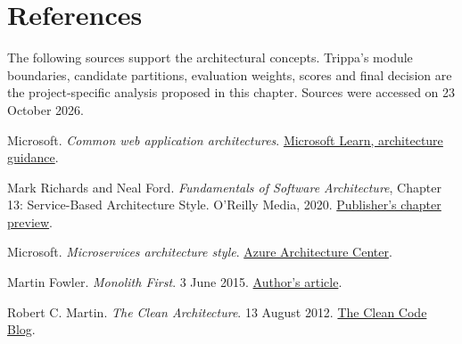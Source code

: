 \section{References}
The following sources support the architectural concepts. Trippa's module boundaries, candidate partitions, evaluation weights, scores and final decision are the project-specific analysis proposed in this chapter. Sources were accessed on 23 October 2026.
\begin{enumerate}[label={[\arabic*]},leftmargin=*,itemsep=8pt]
\item\label{ref:common} Microsoft. \emph{Common web application architectures}. \href{https://learn.microsoft.com/en-us/dotnet/architecture/modern-web-apps-azure/common-web-application-architectures}{Microsoft Learn, architecture guidance}.
\item\label{ref:servicebased} Mark Richards and Neal Ford. \emph{Fundamentals of Software Architecture}, Chapter 13: Service-Based Architecture Style. O'Reilly Media, 2020. \href{https://www.oreilly.com/library/view/fundamentals-of-software/9781492043447/ch13.html}{Publisher's chapter preview}.
\item\label{ref:microservices} Microsoft. \emph{Microservices architecture style}. \href{https://learn.microsoft.com/en-us/azure/architecture/guide/architecture-styles/microservices}{Azure Architecture Center}.
\item\label{ref:monolithfirst} Martin Fowler. \emph{Monolith First}. 3 June 2015. \href{https://martinfowler.com/bliki/MonolithFirst.html}{Author's article}.
\item\label{ref:clean} Robert C. Martin. \emph{The Clean Architecture}. 13 August 2012. \href{https://blog.cleancoder.com/uncle-bob/2012/08/13/the-clean-architecture.html}{The Clean Code Blog}.
\end{enumerate}
